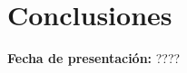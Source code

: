 \documentclass[../portafolio.tex]{subfiles}
\begin{document}
\chapter*{Conclusiones}

\hfill \textbf{Fecha de presentación:} ????

\medskip






\end{document}
